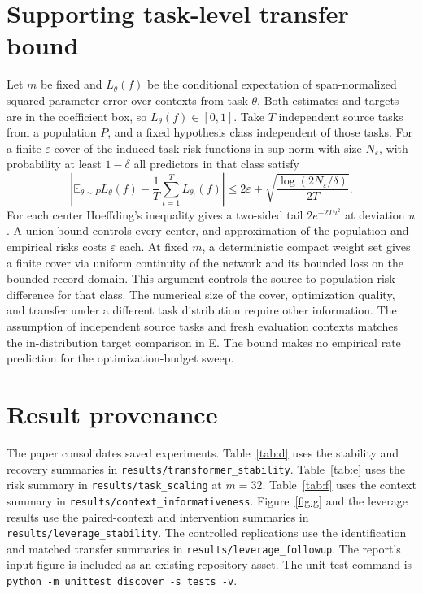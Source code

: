 \documentclass[11pt,letterpaper]{article}
\begin{document}
\section{Supporting task-level transfer bound}
\label{app:transfer}
Let \(m\) be fixed and \(L_\theta(f)\) be the conditional expectation
of span-normalized squared parameter error over contexts from task
\(\theta\). Both estimates and targets are in the coefficient box,
so \(L_\theta(f)\in[0,1]\). Take \(T\) independent source tasks from
a population \(P\), and a fixed hypothesis class independent of those
tasks. For a finite \(\varepsilon\)-cover of the induced task-risk
functions in sup norm with size \(N_\varepsilon\), with probability
at least \(1-\delta\) all predictors in that class satisfy
\[
 \left|\mathbb E_{\theta\sim P}L_\theta(f)
   -\frac{1}{T}\sum_{t=1}^T L_{\theta_t}(f)\right|
 \le 2\varepsilon+\sqrt{\frac{\log(2N_\varepsilon/\delta)}{2T}} .
\]
For each center Hoeffding's inequality gives a two-sided tail
\(2e^{-2Tu^2}\) at deviation \(u\). A union bound controls every
center, and approximation of the population and empirical risks
costs \(\varepsilon\) each. At fixed \(m\), a deterministic compact
weight set gives a finite cover via uniform continuity of the
network and its bounded loss on the bounded record domain.
This argument controls the source-to-population risk difference
for that class. The numerical size of the cover, optimization
quality, and transfer under a different task distribution require
other information. The assumption of independent source tasks and
fresh evaluation contexts matches the in-distribution target
comparison in E. The bound makes no empirical rate prediction for
the optimization-budget sweep.

\section{Result provenance}
\label{app:results}
\begingroup
\raggedright
The paper consolidates saved experiments. Table~\ref{tab:d} uses
the stability and recovery summaries in
\texttt{results/transformer\_stability}. Table~\ref{tab:e} uses
the risk summary in \texttt{results/task\_scaling} at \(m=32\).
Table~\ref{tab:f} uses the context summary in
\texttt{results/context\_informativeness}. Figure~\ref{fig:g}
and the leverage results use the paired-context and intervention
summaries in \texttt{results/leverage\_stability}. The controlled
replications use the identification and matched transfer summaries
in \texttt{results/leverage\_followup}. The report's input figure is
included as an existing repository asset. The unit-test command is
\texttt{python -m unittest discover -s tests -v}.\par
\endgroup
\end{document}
